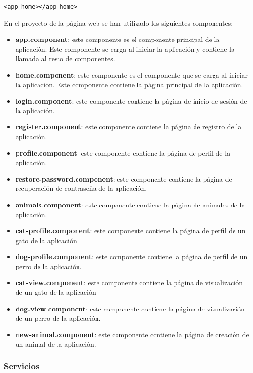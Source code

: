 \begin{lstlisting}
<app-home></app-home>
\end{lstlisting}

En el proyecto de la página web se han utilizado los siguientes componentes:

\begin{itemize}
    \item \textbf{app.component}: este componente es el componente principal de la aplicación. Este componente se carga al iniciar la aplicación
    y contiene la llamada al resto de componentes.
    \item \textbf{home.component}: este componente es el componente que se carga al iniciar la aplicación. Este componente contiene la página principal
    de la aplicación.
    \item \textbf{login.component}: este componente contiene la página de inicio de sesión de la aplicación.
    \item \textbf{register.component}: este componente contiene la página de registro de la aplicación.
    \item \textbf{profile.component}: este componente contiene la página de perfil de la aplicación.
    \item \textbf{restore-password.component}: este componente contiene la página de recuperación de contraseña de la aplicación.
    \item \textbf{animals.component}: este componente contiene la página de animales de la aplicación.
    \item \textbf{cat-profile.component}: este componente contiene la página de perfil de un gato de la aplicación.
    \item \textbf{dog-profile.component}: este componente contiene la página de perfil de un perro de la aplicación.
    \item \textbf{cat-view.component}: este componente contiene la página de visualización de un gato de la aplicación.
    \item \textbf{dog-view.component}: este componente contiene la página de visualización de un perro de la aplicación.
    \item \textbf{new-animal.component}: este componente contiene la página de creación de un animal de la aplicación.
\end{itemize}

\newpage

\subsubsection{Servicios}\label{subsubsec:servicios}


